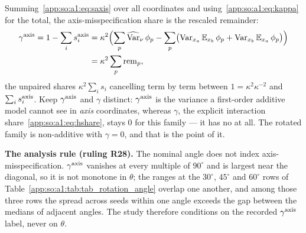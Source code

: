 Summing~\eqref{app:so:a1:eq:saxis} over all coordinates and
using~\eqref{app:so:a1:eq:kappa} for the total, the axis-misspecification
share is the rescaled remainder:
\begin{equation}\label{app:so:a1:eq:gammaaxis}
  \begin{aligned}
    \gaxis=1-\sum_i\saxis{i}
    &=\kappa^2\Bigl(\sum_p\Varhat\phip
      -\sum_p\bigl(\Varx{x_a}\Ex{x_b}\phip
                   +\Varx{x_b}\Ex{x_a}\phip\bigr)\Bigr)\\
    &=\kappa^2\sum_p\mathrm{rem}_p ,
  \end{aligned}
\end{equation}
the unpaired shares $\kappa^2\sum_i s_i$ cancelling term by term between
$1=\kappa^2\kappa^{-2}$ and $\sum_is_{i}^{\mathrm{axis}}$. Keep $\gaxis$ and $\gamma$
distinct: $\gaxis$ is the variance a first-order additive model cannot see in
\emph{axis} coordinates, whereas $\gamma$, the explicit interaction
share~\eqref{app:so:a1:eq:hshare}, stays $0$ for this family --- it has no
 at all. The rotated family is non-additive with
$\gamma=0$, and that is the point of it.

\textbf{The analysis rule (ruling R28).} The nominal angle does not index
axis-misspecification. $\gaxis$ vanishes at every multiple of $90^\circ$ and
is largest near the diagonal, so it is not monotone in $\theta$; the ranges at
the $30^\circ$, $45^\circ$ and $60^\circ$ rows of
Table~\ref{app:so:a1:tab:tab_rotation_angle} overlap one another, and among
those three rows the spread across seeds within one angle exceeds the gap
between the medians of adjacent angles. The study therefore conditions on the
recorded $\gaxis$ label, never on $\theta$.

\begin{table}[htbp]
  \centering
  \caption[Rotation at six angles: $\gaxis$, $\kappa$ and $\mu$]{
  Rotation at six angles: the axis-misspecification share $\gaxis$
  of~\eqref{app:so:a1:eq:gammaaxis}, the renormalization $\kappa$ and the
  recentering offset $\mu$ of~\eqref{app:so:a1:eq:kappa}
  and~\eqref{app:so:a1:eq:mu}. Measured on the archived grid, seeds $0$--$9$,
  $D=\SOnumStudyD$: the study's own angles, plus three further angles built from the
  same specification with $\theta$ overridden. At $\theta\in\{0^\circ,
  90^\circ\}$, $\kappa$ is exactly $1$ at every seed and $\gaxis$ is zero up
  to floating-point epsilon --- never a genuinely negative quantity,
  as~\eqref{app:so:a1:eq:remainder} requires; the file's header comment
  records the per-seed residuals.}\label{app:so:a1:tab:tab_rotation_angle}
  \small\setlength{\tabcolsep}{3pt}
  
\end{table}

